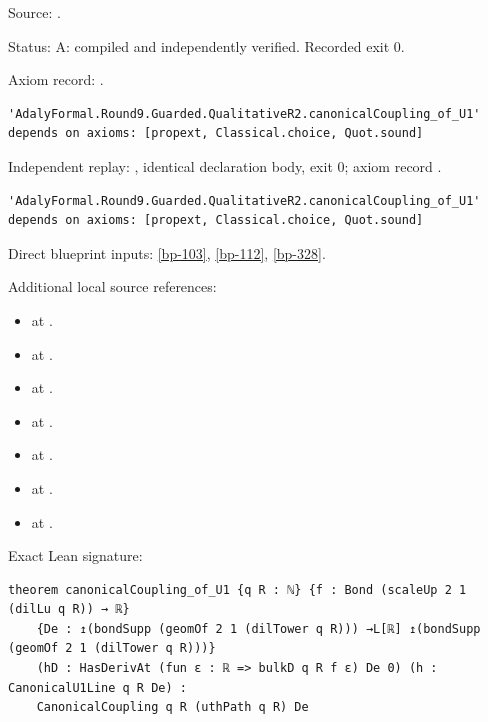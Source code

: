 \begin{theorem}[bp-114]
\par Source: \texttt{}.
\par Status: A: compiled and independently verified. Recorded exit 0.
\par Axiom record: \texttt{}.
\begin{verbatim}
'AdalyFormal.Round9.Guarded.QualitativeR2.canonicalCoupling_of_U1' depends on axioms: [propext, Classical.choice, Quot.sound]
\end{verbatim}
\par Independent replay: \texttt{}, identical declaration body, exit 0; axiom record \texttt{}.
\begin{verbatim}
'AdalyFormal.Round9.Guarded.QualitativeR2.canonicalCoupling_of_U1' depends on axioms: [propext, Classical.choice, Quot.sound]
\end{verbatim}
\par Direct blueprint inputs: \ref{bp-103}, \ref{bp-112}, \ref{bp-328}.
\par Additional local source references:
\begin{itemize}
\item \texttt{} at \texttt{}.
\item \texttt{} at \texttt{}.
\item \texttt{} at \texttt{}.
\item \texttt{} at \texttt{}.
\item \texttt{} at \texttt{}.
\item \texttt{} at \texttt{}.
\item \texttt{} at \texttt{}.
\end{itemize}
\par Exact Lean signature:
\begin{verbatim}
theorem canonicalCoupling_of_U1 {q R : ℕ} {f : Bond (scaleUp 2 1 (dilLu q R)) → ℝ}
    {De : ↥(bondSupp (geomOf 2 1 (dilTower q R))) →L[ℝ] ↥(bondSupp (geomOf 2 1 (dilTower q R)))}
    (hD : HasDerivAt (fun ε : ℝ => bulkD q R f ε) De 0) (h : CanonicalU1Line q R De) :
    CanonicalCoupling q R (uthPath q R) De
\end{verbatim}
\end{theorem}

